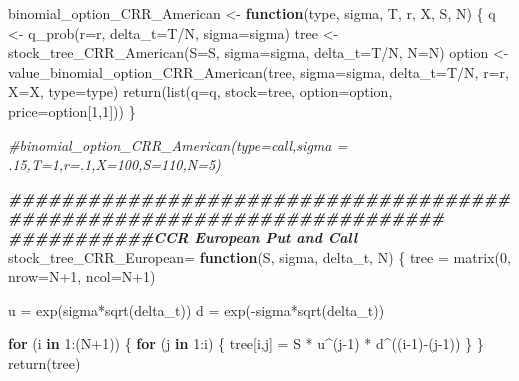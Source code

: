 \documentclass[
]{article}
\newenvironment{Shaded}{\begin{snugshade}}{\end{snugshade}}
\newcommand{\AttributeTok}[1]{\textcolor[rgb]{0.77,0.63,0.00}{#1}}
\newcommand{\CommentTok}[1]{\textcolor[rgb]{0.56,0.35,0.01}{\textit{#1}}}
\newcommand{\ControlFlowTok}[1]{\textcolor[rgb]{0.13,0.29,0.53}{\textbf{#1}}}
\newcommand{\DecValTok}[1]{\textcolor[rgb]{0.00,0.00,0.81}{#1}}
\newcommand{\DocumentationTok}[1]{\textcolor[rgb]{0.56,0.35,0.01}{\textbf{\textit{#1}}}}
\newcommand{\FunctionTok}[1]{\textcolor[rgb]{0.00,0.00,0.00}{#1}}
\newcommand{\NormalTok}[1]{#1}
\newcommand{\OtherTok}[1]{\textcolor[rgb]{0.56,0.35,0.01}{#1}}
\newcommand{\SpecialCharTok}[1]{\textcolor[rgb]{0.00,0.00,0.00}{#1}}
\begin{document}
\begin{Shaded}
\begin{Highlighting}[]
\NormalTok{binomial\_option\_CRR\_American }\OtherTok{\textless{}{-}} \ControlFlowTok{function}\NormalTok{(type, sigma, T, r, X, S, N) \{}
\NormalTok{  q }\OtherTok{\textless{}{-}} \FunctionTok{q\_prob}\NormalTok{(}\AttributeTok{r=}\NormalTok{r, }\AttributeTok{delta\_t=}\NormalTok{T}\SpecialCharTok{/}\NormalTok{N, }\AttributeTok{sigma=}\NormalTok{sigma)}
\NormalTok{  tree }\OtherTok{\textless{}{-}} \FunctionTok{stock\_tree\_CRR\_American}\NormalTok{(}\AttributeTok{S=}\NormalTok{S, }\AttributeTok{sigma=}\NormalTok{sigma, }\AttributeTok{delta\_t=}\NormalTok{T}\SpecialCharTok{/}\NormalTok{N, }\AttributeTok{N=}\NormalTok{N)}
\NormalTok{  option }\OtherTok{\textless{}{-}} \FunctionTok{value\_binomial\_option\_CRR\_American}\NormalTok{(tree, }\AttributeTok{sigma=}\NormalTok{sigma, }\AttributeTok{delta\_t=}\NormalTok{T}\SpecialCharTok{/}\NormalTok{N, }\AttributeTok{r=}\NormalTok{r, }\AttributeTok{X=}\NormalTok{X, }\AttributeTok{type=}\NormalTok{type)}
  \FunctionTok{return}\NormalTok{(}\FunctionTok{list}\NormalTok{(}\AttributeTok{q=}\NormalTok{q, }\AttributeTok{stock=}\NormalTok{tree, }\AttributeTok{option=}\NormalTok{option, }\AttributeTok{price=}\NormalTok{option[}\DecValTok{1}\NormalTok{,}\DecValTok{1}\NormalTok{]))}
\NormalTok{\}}

\CommentTok{\#binomial\_option\_CRR\_American(type=\textquotesingle{}call\textquotesingle{},sigma = .15,T=1,r=.1,X=100,S=110,N=5)}

\DocumentationTok{\#\#\#\#\#\#\#\#\#\#\#\#\#\#\#\#\#\#\#\#\#\#\#\#\#\#\#\#\#\#\#\#\#\#\#\#\#\#\#\#\#\#\#\#\#\#\#\#\#\#\#\#\#\#\#\#\#\#\#\#\#\#\#\#\#\#\#\#\#\#\#}
\DocumentationTok{\#\#\#\#\#\#\#\#\#\#\#CCR European Put and Call}
\NormalTok{stock\_tree\_CRR\_European}\OtherTok{=} \ControlFlowTok{function}\NormalTok{(S, sigma, delta\_t, N) \{}
\NormalTok{  tree }\OtherTok{=} \FunctionTok{matrix}\NormalTok{(}\DecValTok{0}\NormalTok{, }\AttributeTok{nrow=}\NormalTok{N}\SpecialCharTok{+}\DecValTok{1}\NormalTok{, }\AttributeTok{ncol=}\NormalTok{N}\SpecialCharTok{+}\DecValTok{1}\NormalTok{)}
  
\NormalTok{  u }\OtherTok{=} \FunctionTok{exp}\NormalTok{(sigma}\SpecialCharTok{*}\FunctionTok{sqrt}\NormalTok{(delta\_t))}
\NormalTok{  d }\OtherTok{=} \FunctionTok{exp}\NormalTok{(}\SpecialCharTok{{-}}\NormalTok{sigma}\SpecialCharTok{*}\FunctionTok{sqrt}\NormalTok{(delta\_t))}
  
  \ControlFlowTok{for}\NormalTok{ (i }\ControlFlowTok{in} \DecValTok{1}\SpecialCharTok{:}\NormalTok{(N}\SpecialCharTok{+}\DecValTok{1}\NormalTok{)) \{}
    \ControlFlowTok{for}\NormalTok{ (j }\ControlFlowTok{in} \DecValTok{1}\SpecialCharTok{:}\NormalTok{i) \{}
\NormalTok{      tree[i,j] }\OtherTok{=}\NormalTok{ S }\SpecialCharTok{*}\NormalTok{ u}\SpecialCharTok{\^{}}\NormalTok{(j}\DecValTok{{-}1}\NormalTok{) }\SpecialCharTok{*}\NormalTok{ d}\SpecialCharTok{\^{}}\NormalTok{((i}\DecValTok{{-}1}\NormalTok{)}\SpecialCharTok{{-}}\NormalTok{(j}\DecValTok{{-}1}\NormalTok{))}
\NormalTok{    \}}
\NormalTok{  \}}
  \FunctionTok{return}\NormalTok{(tree)}
  

\end{Highlighting}
\end{Shaded}
\end{document}
